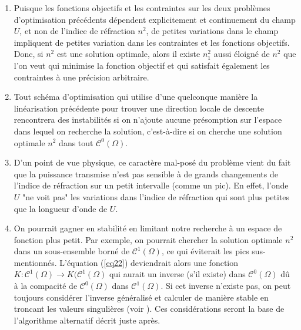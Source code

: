 \documentclass{article}
\begin{document}
\begin{enumerate}
\item Puisque les fonctions objectifs et les contraintes sur les deux problèmes d'optimisation précédents dépendent explicitement et continuement du champ $U$, et non de l'indice de réfraction $n^2$, de petites variations dans le champ impliquent de petites variation dans les contraintes et les fonctions objectifs. Donc, si $n^2$ est une solution optimale, alors il existe $n_1^2$ aussi éloigné de $n^2$ que l'on veut qui minimise la fonction objectif et qui satisfait également les contraintes à une précision arbitraire.
\item Tout schéma d'optimisation qui utilise d'une quelconque manière la linéarisation précédente pour trouver une direction locale de descente rencontrera des instabilités si on n'ajoute aucune présomption sur l'espace dans lequel on recherche la solution, c'est-à-dire si on cherche une solution optimale $n^2$ dans tout $\mathscr{C}^0(\Omega)$.
\item D'un point de vue physique, ce caractère mal-posé du problème vient du fait que la puissance transmise n'est pas sensible à de grands changements de l'indice de réfraction sur un petit intervalle (comme un pic). En effet, l'onde $U$ "ne voit pas" les variations dans l'indice de réfraction qui sont plus petites que la longueur d'onde de $U$.
\item On pourrait gagner en stabilité en limitant notre recherche à un espace de fonction plus petit. Par exemple, on pourrait chercher la solution optimale $n^2$ dans un sous-ensemble borné de $\mathscr{C}^1(\Omega)$, ce qui éviterait les pics sus-mentionnés. L'équation (\ref{eq22}) deviendrait alors une fonction $K : \mathscr{C}^1(\Omega)\to K(\mathscr{C}^1(\Omega)$ qui aurait un inverse (s'il existe) dans $\mathcal{C}^0(\Omega)$ dû à la compacité de $\mathscr{C}^0(\Omega)$ dans $\mathscr{C}^1(\Omega)$. Si cet inverse n'existe pas, on peut toujours considérer l'inverse généralisé et calculer de manière stable en troncant les valeurs singulières (voir \cite{engl96regu}). Ces considérations seront la base de l'algorithme alternatif décrit juste après.
\end{enumerate}
\end{document}
